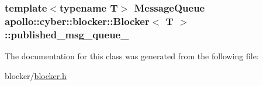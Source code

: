 \hypertarget{classapollo_1_1cyber_1_1blocker_1_1Blocker_afeb0c15d39a0c555540858cfc86a2ce3}{
\subsubsection[{published\-\_\-msg\-\_\-queue\-\_\-}]{\setlength{\rightskip}{0pt plus 5cm}template$<$typename T$>$ {\bf Message\-Queue} {\bf apollo\-::cyber\-::blocker\-::\-Blocker}$<$ T $>$\-::published\-\_\-msg\-\_\-queue\-\_\-\hspace{0.3cm}{\ttfamily [private]}}}\label{classapollo_1_1cyber_1_1blocker_1_1Blocker_afeb0c15d39a0c555540858cfc86a2ce3}


The documentation for this class was generated from the following file\-:\begin{DoxyCompactItemize}
\item 
blocker/\hyperlink{blocker_8h}{blocker.\-h}\end{DoxyCompactItemize}
